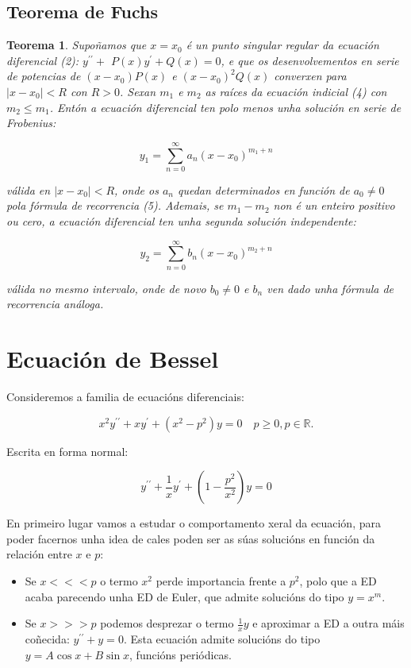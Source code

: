 \documentclass[a4paper,12pt,titlepage]{article}
\newtheorem{theorem}{Teorema}
\begin{document}
\subsection{Teorema de Fuchs}

\begin{theorem}
    Supoñamos que $x=x_{0}$ é un punto singular regular da ecuación diferencial (2): $y^{\prime \prime}+$ $P(x) y^{\prime}+Q(x)=0$, e que os desenvolvementos en serie de potencias de $\left(x-x_{0}\right) P(x)$ e $\left(x-x_{0}\right)^{2} Q(x)$ converxen para $\left|x-x_{0}\right|<R$ con $R>0$. Sexan $m_{1}$ e $m_{2}$ as raíces da ecuación indicial (4) con $m_{2} \leq m_{1}$. Entón a ecuación diferencial ten polo menos unha solución en serie de Frobenius:

$$
y_{1}=\sum_{n=0}^{\infty} a_{n}\left(x-x_{0}\right)^{m_{1}+n}
$$

válida en $\left|x-x_{0}\right|<R$, onde os $a_{n}$ quedan determinados en función de $a_{0} \neq 0$ pola fórmula de recorrencia (5). Ademais, se $m_{1}-m_{2}$ non é un enteiro positivo ou cero, a ecuación diferencial ten unha segunda solución independente:

$$
y_{2}=\sum_{n=0}^{\infty} b_{n}\left(x-x_{0}\right)^{m_{2}+n}
$$

válida no mesmo intervalo, onde de novo $b_{0} \neq 0$ e $b_{n}$ ven dado unha fórmula de recorrencia análoga.
\end{theorem}

\newpage

\section{Ecuación de Bessel}

Consideremos a familia de ecuacións diferenciais:

$$
x^{2} y^{\prime \prime}+x y^{\prime}+\left(x^{2}-p^{2}\right) y=0 \quad p \geq 0, p \in \mathbb{R} .
$$

Escrita en forma normal:

$$
y^{\prime \prime} + \frac{1}{x} y^{\prime} + \left (1-\frac{p^2}{x^2}\right ) y = 0
$$

En primeiro lugar vamos a estudar o comportamento xeral da ecuación, para poder facernos unha idea de cales poden ser as súas solucións en función da relación entre $x$ e $p$:

\begin{itemize}
    \item Se $x<<<p$ o termo $x^2$ perde importancia frente a $p^2$, polo que a ED acaba parecendo unha ED de Euler, que admite solucións do tipo $y=x^m$.
    \item Se $x>>>p$ podemos desprezar o termo $\frac{1}{x}y$ e aproximar a ED a outra máis coñecida: $y^{\prime \prime} + y =0$. Esta ecuación admite solucións do tipo $y=A\cos x + B\sin x$, funcións periódicas.
\end{itemize}
\end{document}
